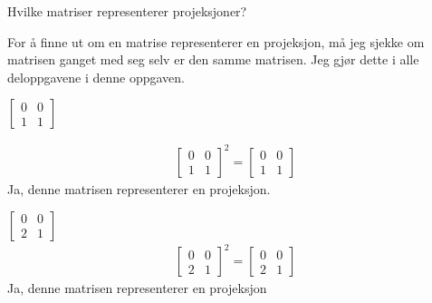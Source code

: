 \documentclass[11pt, a4paper, norsk]{NTNUoving}
\begin{document}
   \begin{oppgave}
       Hvilke matriser representerer projeksjoner?
       
      For å finne ut om en matrise representerer en projeksjon, må jeg sjekke om matrisen ganget med seg selv er den samme matrisen. Jeg gjør dette i alle deloppgavene i denne oppgaven.
       \begin{punkt}
           $
           \begin{bmatrix}
               0 & 0 \\
               1 & 1
           \end{bmatrix}
           $

           \begin{align*}
                \begin{bmatrix}
                    0 & 0 \\
                    1 & 1
                \end{bmatrix}^2 = \begin{bmatrix}
                    0 & 0 \\
                    1 & 1
                \end{bmatrix}            
           \end{align*}
           Ja, denne matrisen representerer en projeksjon.
       \end{punkt}
       \begin{punkt}
           $
            \begin{bmatrix}
                0 & 0 \\
                2 & 1
            \end{bmatrix}
           $
           \begin{align*}
                \begin{bmatrix}
                    0 & 0 \\
                    2 & 1
                \end{bmatrix}^2 = \begin{bmatrix}
                    0 & 0 \\
                    2 & 1
                \end{bmatrix}
           \end{align*}
           Ja, denne matrisen representerer en projeksjon
       \end{punkt}
\end{oppgave}
\end{document}
